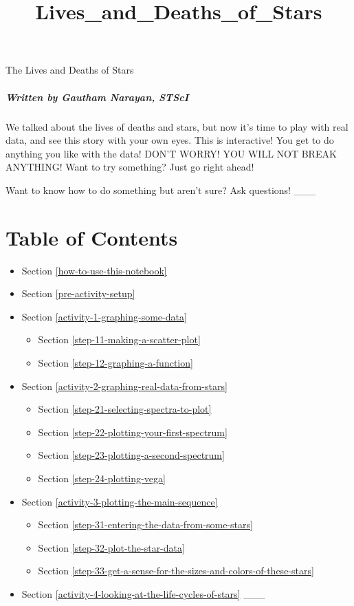\documentclass[11pt]{article}
\title{Lives\_and\_Deaths\_of\_Stars}
\providecommand{\tightlist}{%
      \setlength{\itemsep}{0pt}\setlength{\parskip}{0pt}}
\begin{document}
    
    
    \maketitle
    
    

    
     The Lives and Deaths of Stars

\subparagraph{Written by Gautham Narayan,
STScI}\label{written-by-gautham-narayan-stsci}

We talked about the lives of deaths and stars, but now it's time to play
with real data, and see this story with your own eyes. This is
interactive! You get to do anything you like with the data! DON'T WORRY!
YOU WILL NOT BREAK ANYTHING! Want to try something? Just go right ahead!

Want to know how to do something but aren't sure? Ask questions! \_\_\_

    \section{Table of Contents}\label{table-of-contents}

\begin{itemize}
\tightlist
\item
  Section \ref{how-to-use-this-notebook}
\item
  Section \ref{pre-activity-setup}
\item
  Section \ref{activity-1-graphing-some-data}

  \begin{itemize}
  \tightlist
  \item
    Section \ref{step-11-making-a-scatter-plot}
  \item
    Section \ref{step-12-graphing-a-function}
  \end{itemize}
\item
  Section \ref{activity-2-graphing-real-data-from-stars}

  \begin{itemize}
  \tightlist
  \item
    Section \ref{step-21-selecting-spectra-to-plot}
  \item
    Section \ref{step-22-plotting-your-first-spectrum}
  \item
    Section \ref{step-23-plotting-a-second-spectrum}
  \item
    Section \ref{step-24-plotting-vega}
  \end{itemize}
\item
  Section \ref{activity-3-plotting-the-main-sequence}

  \begin{itemize}
  \tightlist
  \item
    Section \ref{step-31-entering-the-data-from-some-stars}
  \item
    Section \ref{step-32-plot-the-star-data}
  \item
    Section \ref{step-33-get-a-sense-for-the-sizes-and-colors-of-these-stars}
  \end{itemize}
\item
  Section \ref{activity-4-looking-at-the-life-cycles-of-stars} \_\_\_
\end{itemize}
\end{document}
